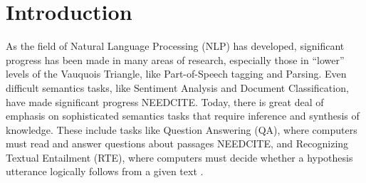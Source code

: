 \documentclass[letterpaper]{article}
\begin{document}
\tableofcontents
\pagebreak


\section{Introduction}

As the field of Natural Language Processing (NLP) has developed, significant
progress has been made in many areas of research, especially those in ``lower''
levels of the Vauquois Triangle, like Part-of-Speech tagging and Parsing.  Even
difficult semantics tasks, like Sentiment Analysis and Document Classification,
have made significant progress NEEDCITE. Today, there is great deal of emphasis
on sophisticated semantics tasks that require inference and synthesis of
knowledge. These include tasks like Question Answering (QA), where computers
must read and answer questions about passages NEEDCITE, and Recognizing Textual
Entailment (RTE), where computers must decide whether a hypothesis utterance
logically follows from a given text \cite{marelli:2014:semeval}.
\end{document}
